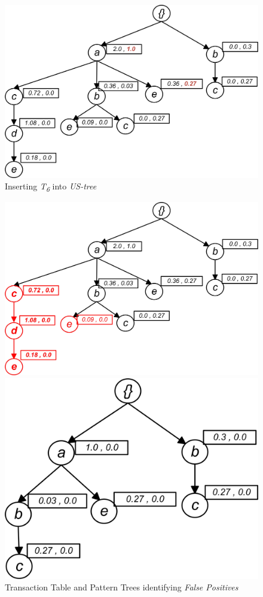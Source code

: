 \begin{figure}
  \centering
	\includegraphics[width=.6\textwidth]{images/sim_06.jpg}  
	\caption{Inserting \emph{T\textsubscript{6}} into \emph{US-tree}}
	\label{figure:t1}
\end{figure}

\begin{figure}
\begin{minipage}{0.50\textwidth}
  \centering
  \includegraphics[width=\textwidth]{images/sim_06_slide.jpg}
\end{minipage}
\hfill
\begin{minipage}{0.50\textwidth}
  \centering
  \includegraphics[width=\textwidth]{images/sim_06_slide_2.jpg}
\end{minipage}
\caption{Transaction Table and Pattern Trees identifying \emph{False Positives}}
\label{figure:frequent_patterns_final}
\end{figure}
%